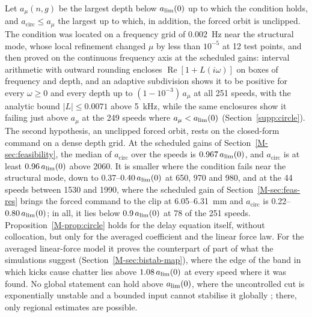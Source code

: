 Let $a_{\mu}(n,g)$ be the largest depth below $a_{\lim}(0)$ up to which the condition holds, and $a_{\mathrm{circ}}\le a_\mu$ the largest up to which, in addition, the forced orbit is unclipped. The condition was located on a frequency grid of \SI{0.002}{\hertz} near the structural mode, whose local refinement changed $\mu$ by less than $10^{-5}$ at 12 test points, and then proved on the continuous frequency axis at the scheduled gains: interval arithmetic with outward rounding encloses $\operatorname{Re}[1+L(i\omega)]$ on boxes of frequency and depth, and an adaptive subdivision shows it to be positive for every $\omega\ge0$ and every depth up to $(1-10^{-3})\,a_\mu$ at all 251 speeds, with the analytic bound $\lvert L\rvert\le0.0071$ above \SI{5}{\kilo\hertz}, while the same enclosures show it failing just above $a_\mu$ at the 249 speeds where $a_\mu<a_{\lim}(0)$ (Section~\ref{supp:circle}). The second hypothesis, an unclipped forced orbit, rests on the closed-form command on a dense depth grid. At the scheduled gains of Section~\ref{M-sec:feasibility}, the median of $a_{\mathrm{circ}}$ over the speeds is $0.967\,a_{\lim}(0)$, and $a_{\mathrm{circ}}$ is at least $0.96\,a_{\lim}(0)$ above \SI{2060}{\rpm}. It is smaller where the condition fails near the structural mode, down to 0.37--$0.40\,a_{\lim}(0)$ at 650, 970 and \SI{980}{\rpm}, and at the 44 speeds between 1530 and \SI{1990}{\rpm}, where the scheduled gain of Section~\ref{M-sec:feas-res} brings the forced command to the clip at 6.05--\SI{6.31}{\milli\metre} and $a_{\mathrm{circ}}$ is 0.22--$0.80\,a_{\lim}(0)$; in all, it lies below $0.9\,a_{\lim}(0)$ at 78 of the 251 speeds. Proposition~\ref{M-prop:circle} holds for the delay equation itself, without collocation, but only for the averaged coefficient and the linear force law. For the averaged linear-force model it proves the counterpart of part of what the simulations suggest (Section~\ref{M-sec:bistab-map}), where the edge of the band in which kicks cause chatter lies above $1.08\,a_{\lim}(0)$ at every speed where it was found. No global statement can hold above $a_{\lim}(0)$, where the uncontrolled cut is exponentially unstable and a bounded input cannot stabilise it globally \citep{hu2001book}; there, only regional estimates are possible.

